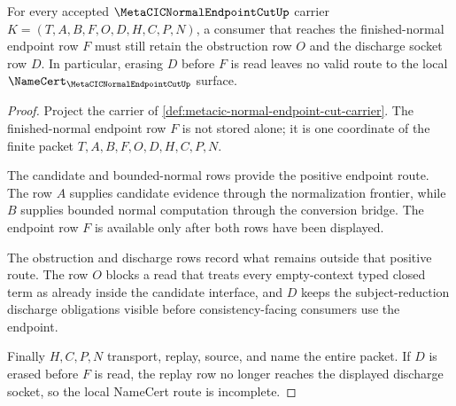 \begin{theorem}
\label{thm:metacic-normal-endpoint-cut-socket-nonescape}
For every accepted $\MetaCICNormalEndpointCutUp$ carrier $K=(T,A,B,F,O,D,H,C,P,N)$, a consumer that reaches the finished-normal endpoint row $F$ must still retain the obstruction row $O$ and the discharge socket row $D$. In particular, erasing $D$ before $F$ is read leaves no valid route to the local $\NameCert_{\MetaCICNormalEndpointCutUp}$ surface.
\end{theorem}
\begin{proof}
Project the carrier of \autoref{def:metacic-normal-endpoint-cut-carrier}. The finished-normal endpoint row $F$ is not stored alone; it is one coordinate of the finite packet $T,A,B,F,O,D,H,C,P,N$.

The candidate and bounded-normal rows provide the positive endpoint route. The row $A$ supplies candidate evidence through the normalization frontier, while $B$ supplies bounded normal computation through the conversion bridge. The endpoint row $F$ is available only after both rows have been displayed.

The obstruction and discharge rows record what remains outside that positive route. The row $O$ blocks a read that treats every empty-context typed closed term as already inside the candidate interface, and $D$ keeps the subject-reduction discharge obligations visible before consistency-facing consumers use the endpoint.

Finally $H,C,P,N$ transport, replay, source, and name the entire packet. If $D$ is erased before $F$ is read, the replay row no longer reaches the displayed discharge socket, so the local NameCert route is incomplete.
\end{proof}



